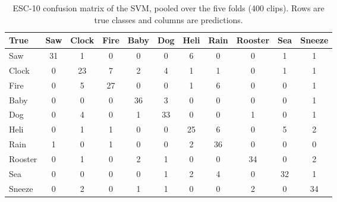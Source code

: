 \begin{table}[H]\centering\small\caption{ESC-10 confusion matrix of the SVM, pooled over the five folds (400 clips). Rows are true classes and columns are predictions.}\label{tab:conf}
\setlength{\tabcolsep}{3pt}\begin{tabular}{lcccccccccc}\toprule True & Saw & Clock & Fire & Baby & Dog & Heli & Rain & Rooster & Sea & Sneeze\\\midrule
Saw & 31 & 1 & 0 & 0 & 0 & 6 & 0 & 0 & 1 & 1\\
Clock & 0 & 23 & 7 & 2 & 4 & 1 & 1 & 0 & 1 & 1\\
Fire & 0 & 5 & 27 & 0 & 0 & 1 & 6 & 0 & 0 & 1\\
Baby & 0 & 0 & 0 & 36 & 3 & 0 & 0 & 0 & 0 & 1\\
Dog & 0 & 4 & 0 & 1 & 33 & 0 & 0 & 1 & 0 & 1\\
Heli & 0 & 1 & 1 & 0 & 0 & 25 & 6 & 0 & 5 & 2\\
Rain & 1 & 0 & 1 & 0 & 0 & 2 & 36 & 0 & 0 & 0\\
Rooster & 0 & 1 & 0 & 2 & 1 & 0 & 0 & 34 & 0 & 2\\
Sea & 0 & 0 & 0 & 0 & 1 & 2 & 4 & 0 & 32 & 1\\
Sneeze & 0 & 2 & 0 & 1 & 1 & 0 & 0 & 2 & 0 & 34\\
\bottomrule\end{tabular}\end{table}
